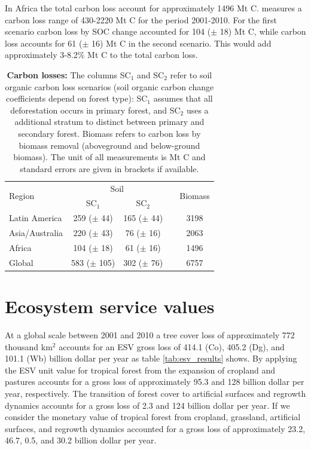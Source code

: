 		In Africa the total carbon loss account for approximately 1496 Mt C. \citet{Achard2014} measures a carbon loss range of 430-2220 Mt C for the period 2001-2010. For the first scenario carbon loss by \ac{SOC} change accounted for 104 ($\pm$ 18) Mt C, while carbon loss accounts for 61 ($\pm$ 16) Mt C in the second scenario. This would add approximately 3-8.2\% Mt C to the total carbon loss.
		\begin{table}[ht]
			\centering
			\caption[Carbon losses]{\textbf{Carbon losses:} The columns SC$_1$ and SC$_2$ refer to soil organic carbon loss scenarios (soil organic carbon change coefficients depend on forest type): SC$_1$ assumes that all deforestation occurs in primary forest, and SC$_2$ uses a additional stratum to distinct between primary and secondary forest. Biomass refers to carbon loss by biomass removal (aboveground and below-ground biomass). The unit of all measurements is Mt C and standard errors are given in brackets if available.}
			\label{tab:soce_tab}
			\begin{tabular}{lccrc}
				\hline
				\multirow{2}{*}{Region}& \multicolumn{2}{c}{Soil} && \multirow{2}{*}{Biomass} \\\cline{2-3}
				& SC$_1$ & SC$_2$ && \\\hline
				Latin America & 259 ($\pm$ 44) & 165 ($\pm$ 44) && 3198\\
				Asia/Australia & 220 ($\pm$ 43) & 76 ($\pm$ 16) && 2063\\
				Africa & 104 ($\pm$ 18) & 61 ($\pm$ 16) && 1496\\
				Global & 583 ($\pm$ 105) & 302 ($\pm$ 76) && 6757\\\hline
			\end{tabular}
		\end{table}

	\section{Ecosystem service values}
		At a global scale between 2001 and 2010 a tree cover loss of approximately 772 thousand km$^2$ accounts for an \ac{ESV} gross loss of 414.1 (Co), 405.2 (Dg), and 101.1 (Wb) billion dollar per year as table \ref{tab:esv_results} shows. By applying the \ac{ESV} unit value for tropical forest from \citet{Costanza2014} the expansion of cropland and pastures accounts for a gross loss of approximately 95.3 and 128 billion dollar per year, respectively. The transition of forest cover to artificial surfaces and regrowth dynamics accounts for a gross loss of 2.3 and 124 billion dollar per year. If we consider the monetary value of tropical forest from \citet{Siikamaki2015} cropland, grassland, artificial surfaces, and regrowth dynamics accounted for a gross loss of approximately 23.2, 46.7, 0.5, and 30.2 billion dollar per year.


